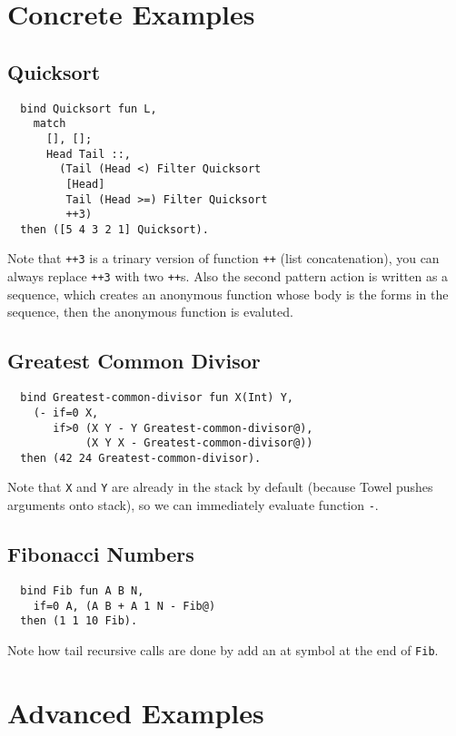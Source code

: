 \documentclass{book}
\begin{document}
\section{Concrete Examples}
\subsection{Quicksort}
\begin{verbatim}
  bind Quicksort fun L,
    match
      [], [];
      Head Tail ::,
        (Tail (Head <) Filter Quicksort
         [Head]
         Tail (Head >=) Filter Quicksort
         ++3)
  then ([5 4 3 2 1] Quicksort).
\end{verbatim}

Note that \texttt{++3} is a trinary version of function \texttt{++} (list concatenation), you can always replace \texttt{++3} with two \texttt{++}s. Also the second pattern action is written as a sequence, which creates an anonymous function whose body is the forms in the sequence, then the anonymous function is evaluted.

\subsection{Greatest Common Divisor}
\begin{verbatim}
  bind Greatest-common-divisor fun X(Int) Y,
    (- if=0 X,
       if>0 (X Y - Y Greatest-common-divisor@),
            (X Y X - Greatest-common-divisor@))
  then (42 24 Greatest-common-divisor).
\end{verbatim}

Note that \texttt{X} and \texttt{Y} are already in the stack by default (because Towel pushes arguments onto stack), so we can immediately evaluate function \texttt{-}.

\subsection{Fibonacci Numbers}
\begin{verbatim}
  bind Fib fun A B N,
    if=0 A, (A B + A 1 N - Fib@)
  then (1 1 10 Fib).
\end{verbatim}

Note how tail recursive calls are done by add an at symbol at the end of \texttt{Fib}.

\section{Advanced Examples}
\end{document}
